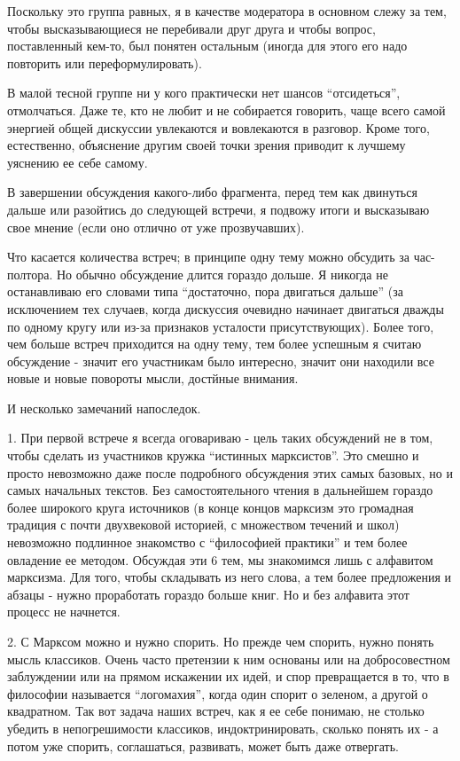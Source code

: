 \documentclass[12pt]{article}
\begin{document}
Поскольку это группа равных, я в качестве модератора в основном слежу за тем, чтобы высказывающиеся не перебивали друг друга и чтобы вопрос, поставленный кем-то, был понятен остальным (иногда для этого его надо повторить или переформулировать).


В малой тесной группе ни у кого практически нет шансов “отсидеться”, отмолчаться. Даже те, кто не любит и не собирается говорить, чаще всего самой энергией общей дискуссии увлекаются и вовлекаются в разговор. Кроме того, естественно, объяснение другим своей точки зрения приводит к лучшему уяснению ее себе самому.


В завершении обсуждения какого-либо фрагмента, перед тем как двинуться дальше или разойтись до следующей встречи, я подвожу итоги и высказываю свое мнение (если оно отлично от уже прозвучавших).


Что касается количества встреч; в принципе одну тему можно обсудить за час-полтора. Но обычно обсуждение длится гораздо дольше. Я никогда не останавливаю его словами типа “достаточно, пора двигаться дальше” (за исключением тех случаев, когда дискуссия очевидно начинает двигаться дважды по одному кругу или из-за признаков усталости присутствующих). Более того, чем больше встреч приходится на одну тему, тем более успешным я считаю обсуждение - значит его участникам было интересно, значит они находили все новые и новые повороты мысли, достйные внимания.


И несколько замечаний напоследок.


1. При первой встрече я всегда оговариваю - цель таких обсуждений не в том, чтобы сделать из участников кружка “истинных марксистов”. Это смешно и просто невозможно даже после подробного обсуждения этих самых базовых, но и самых начальных текстов. Без самостоятельного чтения в дальнейшем гораздо более широкого круга источников (в конце концов марксизм это громадная традиция с почти двухвековой историей, с множеством течений и школ) невозможно подлинное знакомство с “философией практики” и тем более овладение ее методом. Обсуждая эти 6 тем, мы знакомимся лишь с алфавитом марксизма. Для того, чтобы складывать из него слова, а тем более предложения и абзацы - нужно проработать гораздо больше книг. Но и без алфавита этот процесс не начнется.


2. С Марксом можно и нужно спорить. Но прежде чем спорить, нужно понять мысль классиков. Очень часто претензии к ним основаны или на добросовестном заблуждении или на прямом искажении их идей, и спор превращается в то, что в философии называется “логомахия”, когда один спорит о зеленом, а другой о квадратном. Так вот задача наших встреч, как я ее себе понимаю, не столько убедить в непогрешимости классиков, индоктринировать, сколько понять их - а потом уже спорить, соглашаться, развивать, может быть даже отвергать.
\end{document}

